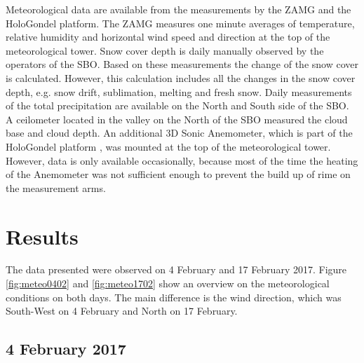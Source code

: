 \documentclass[draft,linenumbers]{agujournal}
\begin{document}
{%

Meteorological data are available from the measurements by the ZAMG and the HoloGondel platform. The ZAMG measures one minute averages of temperature, relative humidity and horizontal wind speed and direction at the top of the meteorological tower. Snow cover depth is daily manually observed by the operators of the SBO. Based on these measurements the change of the snow cover is calculated. However, this calculation includes all the changes in the snow cover depth, e.g. snow drift, sublimation, melting and fresh snow. Daily measurements of the total precipitation are available on the North and South side of the SBO. A ceilometer located in the valley on the North of the SBO measured the cloud base and cloud depth. An additional 3D Sonic Anemometer, which is part of the HoloGondel platform \citep{bec17}, was mounted at the top of the meteorological tower. However, data is only available occasionally, because most of the time the heating of the Anemometer was not sufficient enough to prevent the build up of rime on the measurement arms. 

\section{Results}
\label{Results}

The data presented were observed on 4 February and 17 February 2017. Figure \ref{fig:meteo0402} and \ref{fig:meteo1702} show an overview on the meteorological conditions on both days. The main difference is the wind direction, which was South-West on 4 February and North on 17 February. 

\subsection{4 February 2017}

}
\end{document}
